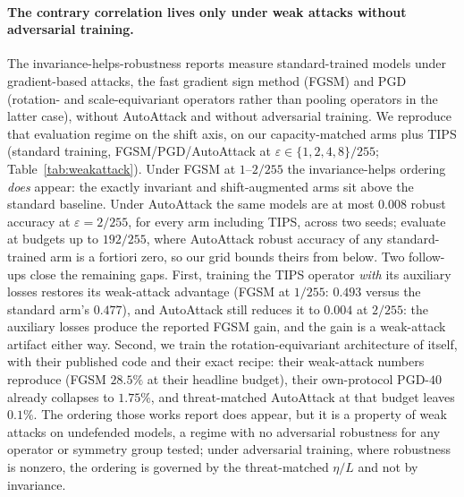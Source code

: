 \documentclass{article}
\theoremstyle{definition}
\begin{document}
\paragraph{The contrary correlation lives only under weak attacks without adversarial training.} The invariance-helps-robustness reports \citep{saha2024improving,wang2025bridging} measure standard-trained models under gradient-based attacks, the fast gradient sign method (FGSM) and PGD (rotation- and scale-equivariant operators rather than pooling operators in the latter case), without AutoAttack and without adversarial training. We reproduce that evaluation regime on the shift axis, on our capacity-matched arms plus TIPS (standard training, FGSM/PGD/AutoAttack at $\varepsilon\in\{1,2,4,8\}/255$; Table~\ref{tab:weakattack}). Under FGSM at $1$--$2/255$ the invariance-helps ordering \emph{does} appear: the exactly invariant and shift-augmented arms sit above the standard baseline. Under AutoAttack the same models are at most $0.008$ robust accuracy at $\varepsilon=2/255$, for every arm including TIPS, across two seeds; \citet{saha2024improving} evaluate at budgets up to $192/255$, where AutoAttack robust accuracy of any standard-trained arm is a fortiori zero, so our grid bounds theirs from below. Two follow-ups close the remaining gaps. First, training the TIPS operator \emph{with} its auxiliary losses restores its weak-attack advantage (FGSM at $1/255$: $0.493$ versus the standard arm's $0.477$), and AutoAttack still reduces it to $0.004$ at $2/255$: the auxiliary losses produce the reported FGSM gain, and the gain is a weak-attack artifact either way. Second, we train the rotation-equivariant architecture of \citet{wang2025bridging} itself, with their published code and their exact recipe: their weak-attack numbers reproduce (FGSM $28.5\%$ at their headline budget), their own-protocol PGD-$40$ already collapses to $1.75\%$, and threat-matched AutoAttack at that budget leaves $0.1\%$. The ordering those works report does appear, but it is a property of weak attacks on undefended models, a regime with no adversarial robustness for any operator or symmetry group tested; under adversarial training, where robustness is nonzero, the ordering is governed by the threat-matched $\eta/L$ and not by invariance.
\end{document}
